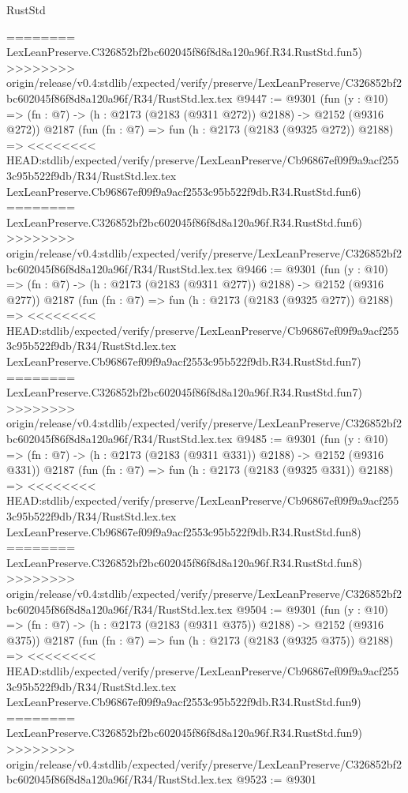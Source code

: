 \begin{lexlean}{RustStd}
\begin{coremodule}
{\begin{coremodule}
{{{{{{{{{{{{{{{========
    LexLeanPreserve.C326852bf2bc602045f86f8d8a120a96f.R34.RustStd.fun5)
>>>>>>>> origin/release/v0.4:stdlib/expected/verify/preserve/LexLeanPreserve/C326852bf2bc602045f86f8d8a120a96f/R34/RustStd.lex.tex
@9447 := @9301
    (fun (y : @10) => (fn : @7) -> (h : @2173 (@2183 (@9311 @272)) @2188) -> @2152 (@9316 @272))
    @2187
    (fun (fn : @7) =>
    fun (h : @2173 (@2183 (@9325 @272)) @2188) =>
<<<<<<<< HEAD:stdlib/expected/verify/preserve/LexLeanPreserve/Cb96867ef09f9a9acf2553c95b522f9db/R34/RustStd.lex.tex
    LexLeanPreserve.Cb96867ef09f9a9acf2553c95b522f9db.R34.RustStd.fun6)
========
    LexLeanPreserve.C326852bf2bc602045f86f8d8a120a96f.R34.RustStd.fun6)
>>>>>>>> origin/release/v0.4:stdlib/expected/verify/preserve/LexLeanPreserve/C326852bf2bc602045f86f8d8a120a96f/R34/RustStd.lex.tex
@9466 := @9301
    (fun (y : @10) => (fn : @7) -> (h : @2173 (@2183 (@9311 @277)) @2188) -> @2152 (@9316 @277))
    @2187
    (fun (fn : @7) =>
    fun (h : @2173 (@2183 (@9325 @277)) @2188) =>
<<<<<<<< HEAD:stdlib/expected/verify/preserve/LexLeanPreserve/Cb96867ef09f9a9acf2553c95b522f9db/R34/RustStd.lex.tex
    LexLeanPreserve.Cb96867ef09f9a9acf2553c95b522f9db.R34.RustStd.fun7)
========
    LexLeanPreserve.C326852bf2bc602045f86f8d8a120a96f.R34.RustStd.fun7)
>>>>>>>> origin/release/v0.4:stdlib/expected/verify/preserve/LexLeanPreserve/C326852bf2bc602045f86f8d8a120a96f/R34/RustStd.lex.tex
@9485 := @9301
    (fun (y : @10) => (fn : @7) -> (h : @2173 (@2183 (@9311 @331)) @2188) -> @2152 (@9316 @331))
    @2187
    (fun (fn : @7) =>
    fun (h : @2173 (@2183 (@9325 @331)) @2188) =>
<<<<<<<< HEAD:stdlib/expected/verify/preserve/LexLeanPreserve/Cb96867ef09f9a9acf2553c95b522f9db/R34/RustStd.lex.tex
    LexLeanPreserve.Cb96867ef09f9a9acf2553c95b522f9db.R34.RustStd.fun8)
========
    LexLeanPreserve.C326852bf2bc602045f86f8d8a120a96f.R34.RustStd.fun8)
>>>>>>>> origin/release/v0.4:stdlib/expected/verify/preserve/LexLeanPreserve/C326852bf2bc602045f86f8d8a120a96f/R34/RustStd.lex.tex
@9504 := @9301
    (fun (y : @10) => (fn : @7) -> (h : @2173 (@2183 (@9311 @375)) @2188) -> @2152 (@9316 @375))
    @2187
    (fun (fn : @7) =>
    fun (h : @2173 (@2183 (@9325 @375)) @2188) =>
<<<<<<<< HEAD:stdlib/expected/verify/preserve/LexLeanPreserve/Cb96867ef09f9a9acf2553c95b522f9db/R34/RustStd.lex.tex
    LexLeanPreserve.Cb96867ef09f9a9acf2553c95b522f9db.R34.RustStd.fun9)
========
    LexLeanPreserve.C326852bf2bc602045f86f8d8a120a96f.R34.RustStd.fun9)
>>>>>>>> origin/release/v0.4:stdlib/expected/verify/preserve/LexLeanPreserve/C326852bf2bc602045f86f8d8a120a96f/R34/RustStd.lex.tex
@9523 := @9301
}}}}}}}}}}}}}}}
\end{coremodule}}
\end{coremodule}
\end{lexlean}
